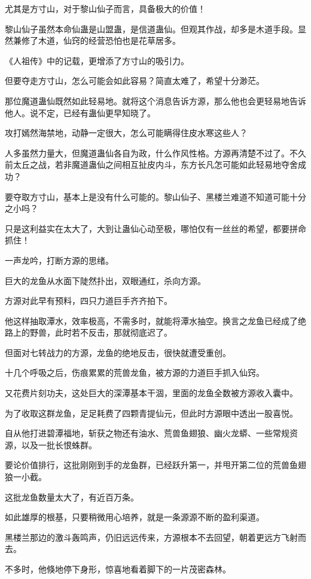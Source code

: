 \begin{this_body}
尤其是方寸山，对于黎山仙子而言，具备极大的价值！

黎山仙子虽然本命仙蛊是山盟蛊，是信道蛊仙。但观其作战，却多是木道手段。显然兼修了木道，仙窍的经营恐怕也是花草居多。

《人祖传》中的记载，更增添了方寸山的吸引力。

但要夺走方寸山，怎么可能会如此容易？简直太难了，希望十分渺茫。

那位魔道蛊仙既然如此轻易地。就将这个消息告诉方源，那么他也会更轻易地告诉他人。说不定，已经有蛊仙更早知晓了。

攻打嫣然海禁地，动静一定很大，怎么可能瞒得住皮水寒这些人？

人多虽然力量大，但魔道蛊仙各自为政，什么作风性格。方源再清楚不过了。不久前太丘之战，若非魔道蛊仙之间相互扯皮内斗，东方长凡怎可能如此轻易地夺舍成功？

要夺取方寸山，基本上是没有什么可能的。黎山仙子、黑楼兰难道不知道可能十分之小吗？

只是这利益实在太大了，大到让蛊仙心动至极，哪怕仅有一丝丝的希望，都要拼命抓住！

一声龙吟，打断方源的思绪。

巨大的龙鱼从水面下陡然扑出，双眼通红，杀向方源。

方源对此早有预料，四只力道巨手齐齐拍下。

他这样抽取潭水，效率极高，不需多时，就能将潭水抽空。换言之龙鱼已经成了绝路上的野兽，此时若不反击，那就彻底迟了。

但面对七转战力的方源，龙鱼的绝地反击，很快就遭受重创。

十几个呼吸之后，伤痕累累的荒兽龙鱼，被方源的力道巨手抓入仙窍。

又花费片刻功夫，这处巨大的深潭基本干涸，里面的龙鱼全数被方源收入囊中。

为了收取这群龙鱼，足足耗费了四颗青提仙元，但此时方源眼中透出一股喜悦。

自从他打进碧潭福地，斩获之物还有油水、荒兽鱼翅狼、幽火龙蟒、一些常规资源，以及一批长恨蛛群。

要论价值排行，这批刚刚到手的龙鱼群，已经跃升第一，并甩开第二位的荒兽鱼翅狼一小截。

这批龙鱼数量太大了，有近百万条。

如此雄厚的根基，只要稍微用心培养，就是一条源源不断的盈利渠道。

黑楼兰那边的激斗轰鸣声，仍旧远远传来，方源根本不去回望，朝着更远方飞射而去。

不多时，他倏地停下身形，惊喜地看着脚下的一片茂密森林。


\end{this_body}

